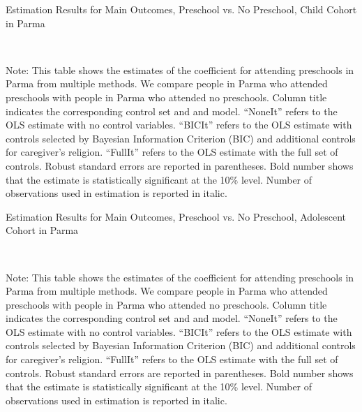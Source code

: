 \begin{table}[H] \caption{Estimation Results for Main Outcomes, Preschool vs. No Preschool, Child Cohort in Parma} \label{ols-M-child-reg-pres-parma}
\scalebox{0.8}{}
\vspace{1ex} \\
\footnotesize\raggedright{Note: This table shows the estimates of the coefficient for attending preschools in Parma from multiple methods. We compare people in Parma who attended preschools with people in Parma who attended no preschools. Column title indicates the corresponding control set and and model. ``NoneIt'' refers to the OLS estimate with no control variables. ``BICIt'' refers to the OLS estimate with controls selected by Bayesian Information Criterion (BIC) and additional controls for caregiver's religion. ``FullIt'' refers to the OLS estimate with the full set of controls. Robust standard errors are reported in parentheses. Bold number shows that the estimate is statistically significant at the 10\% level. Number of observations used in estimation is reported in italic.}

\end{table}


\begin{table}[H] \caption{Estimation Results for Main Outcomes, Preschool vs. No Preschool, Adolescent Cohort in Parma} \label{ols-M-adol-reg-pres-parma}
\scalebox{0.8}{}
\vspace{1ex} \\
\footnotesize\raggedright{Note: This table shows the estimates of the coefficient for attending preschools in Parma from multiple methods. We compare people in Parma who attended preschools with people in Parma who attended no preschools. Column title indicates the corresponding control set and and model. ``NoneIt'' refers to the OLS estimate with no control variables. ``BICIt'' refers to the OLS estimate with controls selected by Bayesian Information Criterion (BIC) and additional controls for caregiver's religion. ``FullIt'' refers to the OLS estimate with the full set of controls. Robust standard errors are reported in parentheses. Bold number shows that the estimate is statistically significant at the 10\% level. Number of observations used in estimation is reported in italic.}

\end{table}

